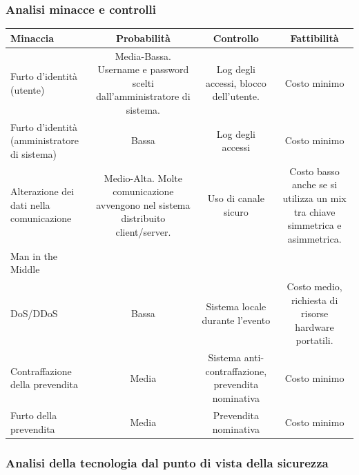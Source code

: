 \documentclass[a4paper]{article}
\begin{document}
\subsubsection{Analisi minacce e controlli}


\begin{center}
    \begin{tabulary}{1\textwidth}{|L|C|C|C|}
        \hline
        \textbf{Minaccia} & \textbf{Probabilità} & \textbf{Controllo} & \textbf{Fattibilità}  \\
        \hline
        \hline
        Furto d’identità (utente) & Media-Bassa. Username e password scelti dall'amministratore di sistema. & Log degli accessi, blocco dell'utente. & Costo minimo\\
        \hline
        Furto d’identità (amministratore di sistema) & Bassa & Log degli accessi & Costo minimo\\
        \hline
        Alterazione dei dati nella comunicazione & Medio-Alta. Molte comunicazione avvengono nel sistema distribuito client/server. & Uso di canale sicuro & Costo basso anche se si utilizza un mix tra chiave simmetrica e asimmetrica.\\
        Man in the Middle &  &  & \\
        \hline
        DoS/DDoS & Bassa & Sistema locale durante l'evento & Costo medio, richiesta di risorse hardware portatili.\\
        \hline
        Contraffazione della prevendita & Media & Sistema anti-contraffazione, prevendita nominativa & Costo minimo\\
        \hline
        Furto della prevendita & Media & Prevendita nominativa & Costo minimo\\
        \hline
    \end{tabulary}
\end{center}

\newpage

\subsubsection{Analisi della tecnologia dal punto di vista della sicurezza}
\end{document}
